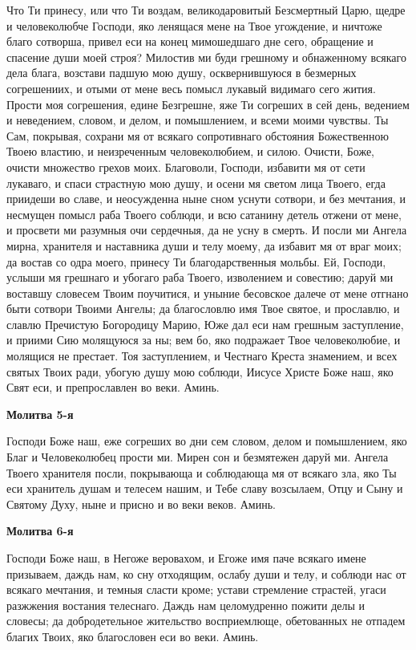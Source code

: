 Что Ти принесу, или что Ти воздам, великодаровитый Безсмертный Царю, щедре и человеколюбче Господи, яко ленящася мене на Твое угождение, и ничтоже благо сотворша, привел еси на конец мимошедшаго дне сего, обращение и спасение души моей строя? Милостив ми буди грешному и обнаженному всякаго дела блага, возстави падшую мою душу, осквернившуюся в безмерных согрешениих, и отыми от мене весь помысл лукавый видимаго сего жития. Прости моя согрешения, едине Безгрешне, яже Ти согреших в сей день, ведением и неведением, словом, и делом, и помышлением, и всеми моими чувствы. Ты Сам, покрывая, сохрани мя от всякаго сопротивнаго обстояния Божественною Твоею властию, и неизреченным человеколюбием, и силою. Очисти, Боже, очисти множество грехов моих. Благоволи, Господи, избавити мя от сети лукаваго, и спаси страстную мою душу, и осени мя светом лица Твоего, егда приидеши во славе, и неосужденна ныне сном уснути сотвори, и без мечтания, и несмущен помысл раба Твоего соблюди, и всю сатанину детель отжени от мене, и просвети ми разумныя очи сердечныя, да не усну в смерть. И посли ми Ангела мирна, хранителя и наставника души и телу моему, да избавит мя от враг моих; да востав со одра моего, принесу Ти благодарственныя мольбы. Ей, Господи, услыши мя грешнаго и убогаго раба Твоего, изволением и совестию; даруй ми воставшу словесем Твоим поучитися, и уныние бесовское далече от мене отгнано быти сотвори Твоими Ангелы; да благословлю имя Твое святое, и прославлю, и славлю Пречистую Богородицу Марию, Юже дал еси нам грешным заступление, и приими Сию молящуюся за ны; вем бо, яко подражает Твое человеколюбие, и молящися не престает. Тоя заступлением, и Честнаго Креста знамением, и всех святых Твоих ради, убогую душу мою соблюди, Иисусе Христе Боже наш, яко Свят еси, и препрославлен во веки. Аминь.


\medskip
\bfseries Молитва 5-я\normalfont{}


Господи Боже наш, еже согреших во дни сем словом, делом и помышлением, яко Благ и Человеколюбец прости ми. Мирен сон и безмятежен даруй ми. Ангела Твоего хранителя посли, покрывающа и соблюдающа мя от всякаго зла, яко Ты еси хранитель душам и телесем нашим, и Тебе славу возсылаем, Отцу и Сыну и Святому Духу, ныне и присно и во веки веков. Аминь.


\medskip
\bfseries Молитва 6-я\normalfont{}


Господи Боже наш, в Негоже веровахом, и Егоже имя паче всякаго имене призываем, даждь нам, ко сну отходящим, ослабу души и телу, и соблюди нас от всякаго мечтания, и темныя сласти кроме; устави стремление страстей, угаси разжжения востания телеснаго. Даждь нам целомудренно пожити делы и словесы; да добродетельное жительство восприемлюще, обетованных не отпадем благих Твоих, яко благословен еси во веки. Аминь.


